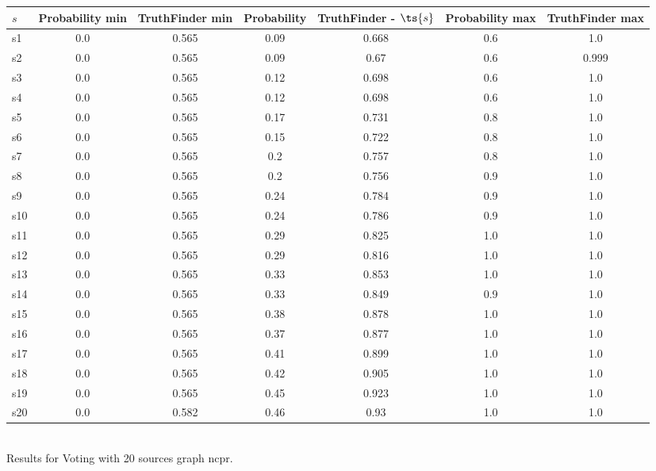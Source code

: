 \documentclass{article}
\begin{document}
\noindent\begin{tabular}{|l|c|c|c|c|c|c|}
\hline
$s$& Probability min & TruthFinder min & Probability & TruthFinder - $\ts{s}$ & Probability max & TruthFinder max\\
\hline
s1 &0.0 & 0.565 & 0.09 & 0.668 & 0.6 & 1.0\\
\hline
s2 &0.0 & 0.565 & 0.09 & 0.67 & 0.6 & 0.999\\
\hline
s3 &0.0 & 0.565 & 0.12 & 0.698 & 0.6 & 1.0\\
\hline
s4 &0.0 & 0.565 & 0.12 & 0.698 & 0.6 & 1.0\\
\hline
s5 &0.0 & 0.565 & 0.17 & 0.731 & 0.8 & 1.0\\
\hline
s6 &0.0 & 0.565 & 0.15 & 0.722 & 0.8 & 1.0\\
\hline
s7 &0.0 & 0.565 & 0.2 & 0.757 & 0.8 & 1.0\\
\hline
s8 &0.0 & 0.565 & 0.2 & 0.756 & 0.9 & 1.0\\
\hline
s9 &0.0 & 0.565 & 0.24 & 0.784 & 0.9 & 1.0\\
\hline
s10 &0.0 & 0.565 & 0.24 & 0.786 & 0.9 & 1.0\\
\hline
s11 &0.0 & 0.565 & 0.29 & 0.825 & 1.0 & 1.0\\
\hline
s12 &0.0 & 0.565 & 0.29 & 0.816 & 1.0 & 1.0\\
\hline
s13 &0.0 & 0.565 & 0.33 & 0.853 & 1.0 & 1.0\\
\hline
s14 &0.0 & 0.565 & 0.33 & 0.849 & 0.9 & 1.0\\
\hline
s15 &0.0 & 0.565 & 0.38 & 0.878 & 1.0 & 1.0\\
\hline
s16 &0.0 & 0.565 & 0.37 & 0.877 & 1.0 & 1.0\\
\hline
s17 &0.0 & 0.565 & 0.41 & 0.899 & 1.0 & 1.0\\
\hline
s18 &0.0 & 0.565 & 0.42 & 0.905 & 1.0 & 1.0\\
\hline
s19 &0.0 & 0.565 & 0.45 & 0.923 & 1.0 & 1.0\\
\hline
s20 &0.0 & 0.582 & 0.46 & 0.93 & 1.0 & 1.0\\
\hline
\end{tabular}\\

\noindent Results for Voting with 20 sources graph ncpr.
\end{document}
